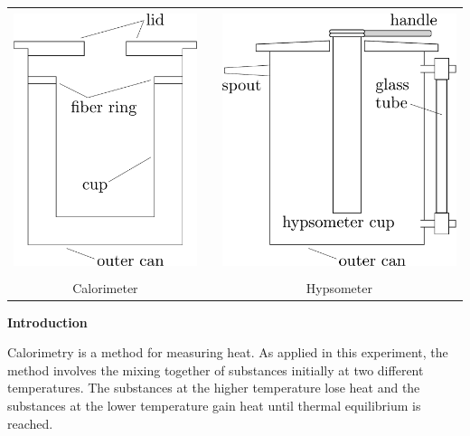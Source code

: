 \begin{center}
\begin{tabular}{ccc}
\includegraphics[height=3.0in]{calorimetry/calorimeter1.pdf} & \hspace{0.6in} & \includegraphics[height=3.0in]{calorimetry/hypsometer1.pdf} \\[5pt]
\LARGE Calorimeter                                           &                & \LARGE Hypsometer  \\
\end{tabular}
\end{center}

\bigskip
\textbf{Introduction} 

Calorimetry is a method for measuring heat. As applied in this experiment,
the method involves the mixing together of substances initially at
two different temperatures. The substances at the higher temperature
lose heat and the substances at the lower temperature gain heat until
thermal equilibrium is reached.


